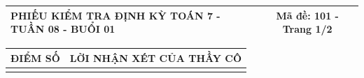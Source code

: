 \documentclass[12pt,a4paper]{article}
\begin{document}
\pagestyle{empty}

\noindent
\begin{tabularx}{\linewidth}{|X|c|}
\hline
\textbf{PHIẾU KIỂM TRA ĐỊNH KỲ TOÁN 7 - TUẦN 08 - BUỔI 01} & \textbf{Mã đề: 101 - Trang 1/2} \\
\hline
\end{tabularx}

\vspace{1.2mm}

\noindent
\begin{tabularx}{\linewidth}{|p{3.2cm}|X|}
\hline
\centering\textbf{ĐIỂM SỐ} & \centering\textbf{LỜI NHẬN XÉT CỦA THẦY CÔ} \tabularnewline
\hline
\rule{0pt}{1.8cm} & \tabularnewline
\hline
\end{tabularx}

\vspace{1.5mm}
\end{document}
